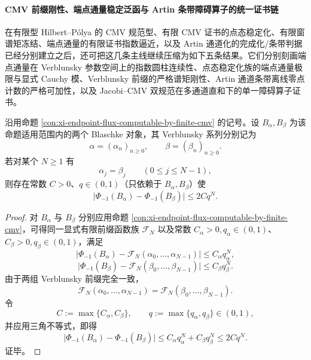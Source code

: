 \paragraph{CMV 前缀刚性、端点通量稳定泛函与 Artin 条带障碍算子的统一证书链}
在有限型 Hilbert--P\'olya 的 CMV 规范型、有限 CMV 证书的点态稳定化、有限窗谱矩冻结、端点通量的有限证书指数逼近，以及 Artin 通道化的完成化/条带判据已经分别建立之后，还可把这几条主线继续压缩为如下五条结果。它们分别刻画端点通量在 Verblunsky 参数空间上的指数圆柱连续性、点态稳定化族的端点通量极限与显式 Cauchy 模、Verblunsky 前缀的严格谱矩刚性、Artin 通道条带离线零点计数的严格可加性，以及 Jacobi--CMV 双规范在多通道直和下的单一障碍算子证书。

\begin{theorem}\label{thm:xi-time-part28c-endpoint-flux-exponential-cylinder-continuity}
沿用命题 \ref{con:xi-endpoint-flux-computable-by-finite-cmv} 的记号。设 \(B_\alpha,B_\beta\) 为该命题适用范围内的两个 Blaschke 对象，其 Verblunsky 系列分别记为
\[
\alpha=(\alpha_n)_{n\ge 0},
\qquad
\beta=(\beta_n)_{n\ge 0}.
\]
若对某个 \(N\ge 1\) 有
\[
\alpha_j=\beta_j
\qquad (0\le j\le N-1),
\]
则存在常数 \(C>0\)、\(q\in(0,1)\)（只依赖于 \(B_\alpha,B_\beta\)）使
\[
\boxed{\;
\bigl|\Phi_{-1}(B_\alpha)-\Phi_{-1}(B_\beta)\bigr|
\le 2Cq^N.\;}
\]
\end{theorem}
\begin{proof}
对 \(B_\alpha\) 与 \(B_\beta\) 分别应用命题 \ref{con:xi-endpoint-flux-computable-by-finite-cmv}，可得同一显式有限前缀函数族 \(\mathcal F_N\) 以及常数 \(C_\alpha>0,q_\alpha\in(0,1)\)、\(C_\beta>0,q_\beta\in(0,1)\)，满足
\[
\bigl|\Phi_{-1}(B_\alpha)-\mathcal F_N(\alpha_0,\dots,\alpha_{N-1})\bigr|
\le C_\alpha q_\alpha^N,
\]
\[
\bigl|\Phi_{-1}(B_\beta)-\mathcal F_N(\beta_0,\dots,\beta_{N-1})\bigr|
\le C_\beta q_\beta^N.
\]
由于两组 Verblunsky 前缀完全一致，
\[
\mathcal F_N(\alpha_0,\dots,\alpha_{N-1})
=
\mathcal F_N(\beta_0,\dots,\beta_{N-1}).
\]
令
\[
C:=\max\{C_\alpha,C_\beta\},
\qquad
q:=\max\{q_\alpha,q_\beta\}\in(0,1),
\]
并应用三角不等式，即得
\[
\bigl|\Phi_{-1}(B_\alpha)-\Phi_{-1}(B_\beta)\bigr|
\le C_\alpha q_\alpha^N+C_\beta q_\beta^N
\le 2Cq^N.
\]
证毕。
\end{proof}

